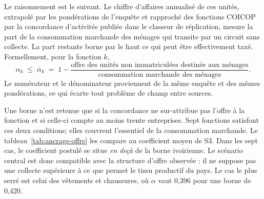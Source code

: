 \documentclass[11pt,a4paper]{article}
\begin{document}
Le raisonnement est le suivant. Le chiffre d'affaires annualisé de ces unités,
extrapolé par les pondérations de l'enquête et rapproché des fonctions COICOP par
la concordance d'activités publiée dans le classeur de réplication, mesure la
part de la consommation marchande des ménages qui transite par un circuit sans
collecte. La part restante borne par le haut ce qui peut être effectivement
taxé. Formellement, pour la fonction $k$,
\[
\alpha_k \;\leq\; \overline{\alpha}_k \;=\; 1 - \frac{\text{offre des unités non immatriculées destinée aux ménages}}{\text{consommation marchande des ménages}}.
\]
Le numérateur et le dénominateur proviennent de la même enquête et des mêmes
pondérations, ce qui écarte tout problème de champ entre sources.

Une borne n'est retenue que si la concordance ne sur-attribue pas l'offre à la
fonction et si celle-ci compte au moins trente entreprises. Sept fonctions
satisfont ces deux conditions; elles couvrent l'essentiel de la consommation
marchande. Le tableau~\ref{tab:ancrage-offre} les compare au coefficient moyen de
S3. Dans les sept cas, le coefficient postulé se situe \emph{en deçà} de la borne
ivoirienne. Le scénario central est donc compatible avec la structure d'offre
observée : il ne suppose pas une collecte supérieure à ce que permet le tissu
productif du pays. Le cas le plus serré est celui des vêtements et chaussures,
où $\alpha$ vaut 0,396 pour une borne de 0,420.
\end{document}
